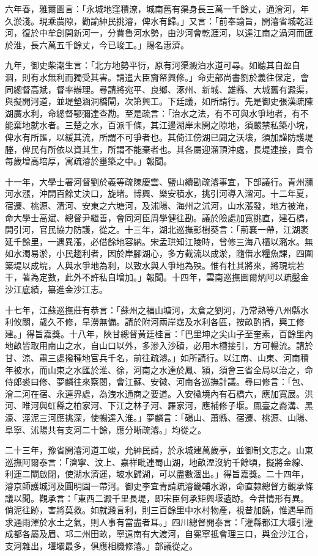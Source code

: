 \begin{pinyinscope}
六年春，雅爾圖言：「永城地窪積潦，城南舊有渠身長三萬一千餘丈，通澮河，年久淤淺。現乘農隙，勸諭紳民挑濬，俾水有歸。」又言：「前奉諭旨，開濬省城乾涯河，復於中牟創開新河一，分賈魯河水勢，由沙河會乾涯河，以達江南之渦河而匯於淮，長六萬五千餘丈，今已竣工。」賜名惠濟。

九年，御史柴潮生言：「北方地勢平衍，原有河渠澱泊水道可尋。如聽其自盈自涸，則有水無利而獨受其害。請遣大臣齎帑興修。」命吏部尚書劉於義往保定，會同總督高斌，督率辦理。尋請將宛平、良鄉、涿州、新城、雄縣、大城舊有澱渠，與擬開河道，並堤墊涵洞橋閘，次第興工。下廷議，如所請行。先是御史張漢疏陳湖廣水利，命總督鄂彌達查勘。至是疏言：「治水之法，有不可與水爭地者，有不能棄地就水者。三楚之水，百派千條，其江邊湖岸未開之隙地，須嚴禁私築小垸，俾水有所匯，以緩其流，所謂不可爭者也。其倚江傍湖已闢之沃壤，須加謹防護堤塍，俾民有所依以資其生，所謂不能棄者也。其各屬迎溜頂沖處，長堤連接，責令每歲增高培厚，寓疏濬於壅築之中。」報聞。

十一年，大學士署河督劉於義等疏陳慶雲、鹽山續勘疏濬事宜，下部議行。青州瀰河水漲，沖開百餘丈決口，旋堵。博興、樂安積水，挑引河導入溜河。十二年夏，宿遷、桃源、清河、安東之六塘河，及沭陽、海州之沭河，山水漲發，地方被淹，命大學士高斌、總督尹繼善，會同河臣周學健往勘。議於險處加寬挑直，建石橋，開引河，官民協力防護，從之。十三年，湖北巡撫彭樹葵言：「荊襄一帶，江湖袤延千餘里，一遇異漲，必借餘地容納。宋孟珙知江陵時，曾修三海八櫃以瀦水。無如水濁易淤，小民趨利者，因於岸腳湖心，多方截流以成淤，隨借水糧魚課，四圍築堤以成垸，人與水爭地為利，以致水與人爭地為殃。惟有杜其將來，將現垸若干，著為定數，此外不許私自增加。」報聞。十四年，雲南巡撫圖爾炳阿以疏鑿金沙江底績，纂進金沙江志。

十七年，江蘇巡撫莊有恭言：「蘇州之福山塘河，太倉之劉河，乃常熟等八州縣水利攸關，歲久不修，旱澇無備。請於附河兩岸霑及水利各區，按畝酌捐，興工修建。」得旨嘉獎。十八年，陜甘總督黃廷桂言：「巴里坤之尖山子至奎素，百餘里內地畝皆取用南山之水，自山口以外，多滲入沙磧，必用木槽接引，方可暢流。請於甘、涼、肅三處撥種地官兵千名，前往疏濬。」如所請行。以江南、山東、河南積年被水，而山東之水匯於淮、徐，河南之水達於鳳、潁，須會三省全局以治之，命侍郎裘曰修、夢麟往來察閱，會江蘇、安徽、河南各巡撫計議。尋曰修言：「包、澮二河在宿、永連界處，為洩水通商之要道。入安徽境內有石橋六，應加寬展。洪河、睢河與虹縣之柏家河、下江之林子河、羅家河，應補修子堰。鳳臺之裔溝、黑濠、涇泥三河應挑深，使暢達入淮。」夢麟言：「碭山、蕭縣、宿遷、桃源、山陽、阜寧、沭陽共有支河二十餘，應分晰疏濬。」均從之。

二十三年，豫省開濬河道工竣，允紳民請，於永城建萬歲亭，並御制文志之。山東巡撫阿爾泰言：「濟寧、汶上、嘉祥毗連蜀山湖，地畝湮沒約千餘頃，擬將金線、利運二閘啟閉，使湖水濟運，坡水歸湖，可以盡數涸出。」得旨嘉獎。二十四年，濬京師護城河及圓明園一帶河。御史李宜青請疏濬畿輔水源，命直隸總督方觀承條議以聞。觀承言：「東西二澱千里長堤，即宋臣何承矩興堰遺跡。今昔情形有異。倘泥往跡，害將莫救。如就澱言利，則三百餘里中水村物產，視昔加饒，惟遇旱而求通雨澤於水土之氣，則人事有當盡者耳。」四川總督開泰言：「灌縣都江大堰引灌成都各屬及眉、邛二州田畝，寧遠南有大渡河，自冕寧抵會理三口，與金沙江合，支河雜出，堰壩最多，俱應相機修濬。」部議從之。


\end{pinyinscope}
